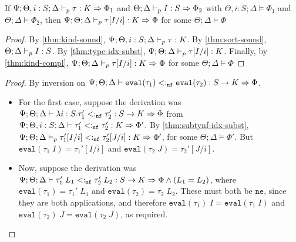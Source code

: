 \begin{theorem}
If $\Psi ; \Theta, i : S ; \Delta \vdash_p \tau : K \Rightarrow \Phi_1$ and $\Theta ; \Delta \vdash_p I : S \Rightarrow \Phi_2$ 
with $\Theta, i : S ; \Delta \vDash \Phi_1$ and $\Theta ; \Delta \vDash \Phi_2$, then
$\Psi ; \Theta ; \Delta \vdash_p \tau[I/i] : K \Rightarrow \Phi$ for some $\Theta ; \Delta \vDash \Phi$
\label{thm:type-idx-algo-subst}
\end{theorem}
\begin{proof}
By \autoref{thm:kind-sound}, $\Psi ; \Theta, i : S ; \Delta \vdash_p \tau : K$.
By \autoref{thm:sort-sound}, $\Theta ; \Delta \vdash_p I : S$.
By \autoref{thm:type-idx-subst}, $\Psi ; \Theta ; \Delta \vdash_p \tau[I/i] : K$.
Finally, by \autoref{thm:kind-compl}, $\Psi ; \Theta ; \Delta \vdash_p \tau[I/i] : K \Rightarrow \Phi$ for some $\Theta ; \Delta \vDash \Phi$
\end{proof}

\subtynfidxsubst*

\evalapplemma*
\begin{proof}
By inversion on $\Psi ; \Theta ; \Delta \vdash \texttt{eval}(\tau_1) <:_{\texttt{nf}} \texttt{eval}(\tau_2) : S \to K \Rightarrow \Phi$.
\begin{itemize}
  \item For the first case, suppose the derivation was $\Psi ; \Theta ; \Delta \vdash \lambda i : S. \tau_1' <:_{\texttt{nf}} \tau_2' : S \to K \Rightarrow \Phi$
  from $\Psi ; \Theta, i : S ; \Delta \vdash \tau_1' <:_{\texttt{nf}} \tau_2' : K \Rightarrow \Phi'$. By \autoref{thm:subtynf-idx-subst},
  $\Psi ; \Theta ; \Delta \vdash_p \tau_1'[I/i] <:_{\texttt{nf}} \tau_2'[J/i] : K \Rightarrow \Phi'$, for some $\Theta ; \Delta \vDash \Phi'$. But $\texttt{eval}(\tau_1 \; I) = \tau_1'[I/i]$ and $\texttt{eval}(\tau_2 \; J) = \tau_2'[J/i]$.
  \item Now, suppose the derivation was $\Psi ; \Theta ; \Delta \vdash \tau_1' \; L_1 <:_{\texttt{nf}} \tau_2' \; L_2 : S \to K \Rightarrow \Phi \wedge (L_1 = L_2)$, where $\texttt{eval}(\tau_1) = \tau_1' \; L_1$ and $\texttt{eval}(\tau_2) = \tau_2 \; L_2$. These must both be $\texttt{ne}$, since they are both applications, and therefore
  $\texttt{eval}(\tau_1) \; I = \texttt{eval}(\tau_1 \; I)$ and $\texttt{eval}(\tau_2) \; J = \texttt{eval}(\tau_2 \; J)$, as required.
\end{itemize}
\end{proof}

\subtycompl*

\admitsweaken*

\tycheckcompl*

